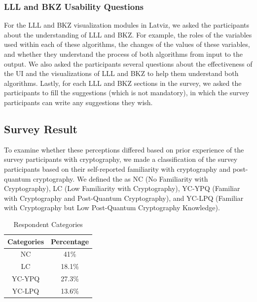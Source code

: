 \documentclass[runningheads]{llncs}
\begin{document}
\subsubsection{LLL and BKZ Usability Questions}
For the LLL and BKZ visualization modules in Latviz, we asked the participants about the understanding of LLL and BKZ. For example, the roles of the variables used within each of these algorithms, the changes of the values of these variables, and whether they understand the process of both algorithms from input to the output. We also asked the participants several questions about the effectiveness of the UI and the visualizations of LLL and BKZ to help them understand both algorithms. Lastly, for each LLL and BKZ sections in the survey, we asked the participants to fill the suggestions (which is not mandatory), in which the survey participants can write any suggestions they wish. 

\subsection{Survey Result}

To examine whether these perceptions differed based on prior experience of the survey participants with cryptography, we made a classification of the survey participants based on their self-reported familiarity with cryptography and post-quantum cryptography. We defined the as NC (No Familiarity with Cryptography), LC (Low Familiarity with Cryptography), YC-YPQ (Familiar with Cryptography and Post-Quantum Cryptography), and YC-LPQ (Familiar with Cryptography but Low Post-Quantum Cryptography Knowledge).

\begin{table}[H]
\centering
\caption{Respondent Categories}
\mbox{}
\label{tab:respondentgroups}
\begin{tabular}{|c|c|} 
 \hline
 Categories & Percentage \\ [0.5ex]
 \hline
 NC & 41\% \\
 \hline
 LC & 18.1\% \\
 \hline
 YC-YPQ & 27.3\% \\
 \hline
 YC-LPQ & 13.6\% \\
 \hline
\end{tabular}
\end{table}

\FloatBarrier
\end{document}
